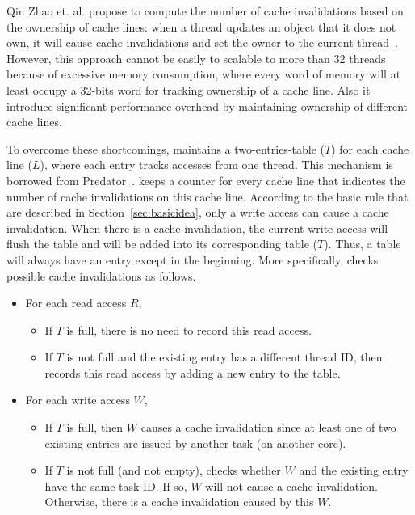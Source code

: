 Qin Zhao et. al. propose to compute the number of cache invalidations based on the ownership of cache lines: when a thread updates an object that it does not own, it will cause cache invalidations and set the owner to the current thread~\cite{qinzhao}. However, this approach cannot be easily to scalable to more than 32 threads because of excessive memory consumption, where every word of memory will at least occupy a 32-bits word for tracking ownership of a cache line. Also it introduce significant performance overhead by maintaining ownership of different cache lines. 

To overcome these shortcomings, \Cheetah{} maintains a two-entries-table ($T$) for each cache line ($L$), where each entry tracks accesses from one thread. This mechanism is borrowed from Predator~\cite{Predator}. \Cheetah{} keeps a counter for every cache line that indicates the number of cache invalidations on this cache line.  
According to the basic rule that are described in Section~\ref{sec:basicidea}, only a write access can cause a cache invalidation. When there is a cache invalidation, the current write access will flush the table and will be added into its corresponding table ($T$). Thus, a table will always have an entry except in the beginning. More specifically, \cheetah{} checks possible cache invalidations as follows.
 
\begin{itemize}
\item
  For each read access $R$,
  \begin{itemize}
    \item
      If $T$ is full, there is no need to record this read access.
    \item
      If $T$ is not full and the existing entry has a different thread ID, 
      then \cheetah{} records this read access by adding a new entry to the table.
  \end{itemize}
\item
  For each write access $W$,  
  \begin{itemize}
    \item
      If $T$ is full, then $W$ causes a cache invalidation since at least one of two existing entries are issued by another task (on another core).
    \item
      If $T$ is not full (and not empty),
      \cheetah{} checks whether $W$ and the existing entry have the same task ID. If
      so, $W$ will not cause a cache invalidation. Otherwise, there is a cache invalidation caused by this $W$.
  \end{itemize}
\end{itemize}

